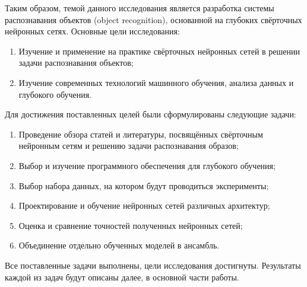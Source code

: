 Таким образом, темой данного исследования является разработка системы распознавания объектов
(object recognition), основанной на глубоких свёрточных нейронных сетях.
Основные цели исследования:
\begin{enumerate}
    \item Изучение и применение на практике свёрточных нейронных сетей в решении задачи распознавания объектов;
    \item Изучение современных технологий машинного обучения, анализа данных и глубокого обучения.
\end{enumerate}
Для достижения поставленных целей были сформулированы следующие задачи:
\begin{enumerate}
    \item Проведение обзора статей и литературы, посвящённых свёрточным нейронным сетям и решению
    задачи распознавания образов;
    \item Выбор и изучение программного обеспечения для глубокого обучения;
    \item Выбор набора данных, на котором будут проводиться эксперименты;
    \item Проектирование и обучение нейронных сетей различных архитектур;
    \item Оценка и сравнение точностей полученных нейронных сетей;
    \item Объединение отдельно обученных моделей в ансамбль.
\end{enumerate}
Все поставленные задачи выполнены, цели исследования достигнуты. Результаты каждой из задач будут 
описаны далее, в основной части работы.
